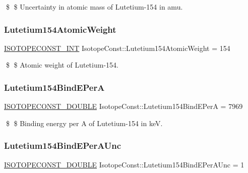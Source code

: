 \$ \$ Uncertainty in atomic mass of Lutetium-\/154 in amu. \mbox{\label{group___isotope_const-_lutetium-_lu154_ga30a6e579147bd1c53a53e8fc22613140}} 
\subsubsection{\texorpdfstring{Lutetium154\+Atomic\+Weight}{Lutetium154AtomicWeight}}
{\footnotesize\ttfamily \mbox{\hyperlink{group___isotope_const-_macros_ga5f18360b3e99483a35c32d789e62621c}{I\+S\+O\+T\+O\+P\+E\+C\+O\+N\+S\+T\+\_\+\+I\+NT}} Isotope\+Const\+::\+Lutetium154\+Atomic\+Weight = 154}

\$ \$ Atomic weight of Lutetium-\/154. \mbox{\label{group___isotope_const-_lutetium-_lu154_ga9754d0f94f720325cf987d47abf217bd}} 
\subsubsection{\texorpdfstring{Lutetium154\+Bind\+E\+PerA}{Lutetium154BindEPerA}}
{\footnotesize\ttfamily \mbox{\hyperlink{group___isotope_const-_macros_ga8f45a7272ce02c0b4c65c44636ed719a}{I\+S\+O\+T\+O\+P\+E\+C\+O\+N\+S\+T\+\_\+\+D\+O\+U\+B\+LE}} Isotope\+Const\+::\+Lutetium154\+Bind\+E\+PerA = 7969}

\$ \$ Binding energy per A of Lutetium-\/154 in keV. \mbox{\label{group___isotope_const-_lutetium-_lu154_ga3badd20acd971b6e4cc24c9166435074}} 
\subsubsection{\texorpdfstring{Lutetium154\+Bind\+E\+Per\+A\+Unc}{Lutetium154BindEPerAUnc}}
{\footnotesize\ttfamily \mbox{\hyperlink{group___isotope_const-_macros_ga8f45a7272ce02c0b4c65c44636ed719a}{I\+S\+O\+T\+O\+P\+E\+C\+O\+N\+S\+T\+\_\+\+D\+O\+U\+B\+LE}} Isotope\+Const\+::\+Lutetium154\+Bind\+E\+Per\+A\+Unc = 1}

